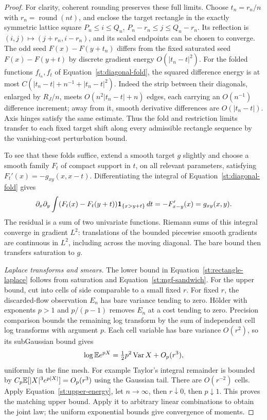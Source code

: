 \begin{proof}
For clarity, coherent rounding preserves these full limits. Choose
$t_n=r_n/n$ with $r_n=\operatorname{round}(nt)$, and enclose the target
rectangle in the exactly symmetric lattice square
$P_n\le i\le Q_n$, $P_n-r_n\le j\le Q_n-r_n$.
Its reflection is $(i,j)\mapsto(j+r_n,i-r_n)$, and its scaled endpoints
can be chosen to converge. The odd seed $F(x)-F(y+t_n)$ differs from the
fixed saturated seed $F(x)-F(y+t)$ by discrete gradient energy
$O(|t_n-t|^2)$. For the folded functions $f_{t_n},f_t$ of
Equation~\eqref{st:diagonal-fold}, the squared difference energy is at most
$C(|t_n-t|+n^{-1}+|t_n-t|^2)$. Indeed the strip between their diagonals,
enlarged by $R_J/n$, meets $O(n^2|t_n-t|+n)$ edges, each carrying an
$O(n^{-1})$ difference increment; away from it, smooth derivative
differences are $O(|t_n-t|)$. Axis hinges satisfy the same estimate.
Thus the fold and restriction limits transfer to each fixed target
shift along every admissible rectangle sequence by the vanishing-cost
perturbation bound.

To see that these folds suffice, extend a smooth target $g$ slightly and
choose a smooth family $F_t$ of compact support in $t$, on all relevant
parameters, satisfying $F_t'(x)=-g_{xy}(x,x-t)$. Differentiating the integral
of Equation~\eqref{st:diagonal-fold} gives
\[
 \partial_x\partial_y\int
 (F_t(x)-F_t(y+t))\mathbf 1_{\{x>y+t\}}\,dt=-F_{x-y}'(x)=g_{xy}(x,y).
\]
The residual is a sum of two univariate functions. Riemann sums of this
integral converge in gradient $L^2$: translations of the bounded piecewise
smooth gradients are continuous in $L^2$, including across the moving
diagonal. The bare bound then transfers saturation to $g$.

\emph{Laplace transforms and smears.}
The lower bound in Equation~\eqref{st:rectangle-laplace} follows from
saturation and Equation~\eqref{st:mgf-sandwich}. For the upper bound, cut
into cells of side comparable to a small fixed $r$. For fixed $r$, the
discarded-flow observation $E_n$ has bare variance tending to zero.
H\"older with exponents $p>1$ and $p/(p-1)$ removes $E_n$ at a cost tending
to zero. Precision comparison bounds the remaining log transform by the
sum of independent cell log transforms with argument $p$. Each cell
variable has bare variance $O(r^2)$, so its subGaussian bound gives
\[
 \log\mathbb E e^{pX}=\tfrac12p^2\operatorname{Var} X+O_p(r^3),
\]
uniformly in the fine mesh. For example Taylor's integral remainder is
bounded by $C_p\mathbb E[|X|^3e^{p|X|}]=O_p(r^3)$ using the Gaussian tail.
There are $O(r^{-2})$ cells. Apply Equation~\eqref{st:upper-energy}, let
$n\to\infty$, then $r\downarrow0$, then $p\downarrow1$. This proves the
matching upper bound. Apply it to arbitrary linear combinations to obtain
the joint law; the uniform exponential bounds give convergence of moments.


\end{proof}
